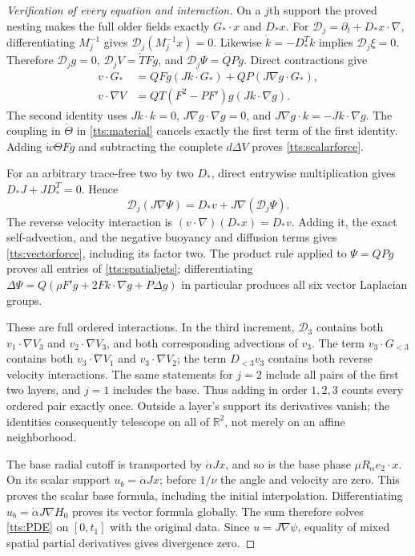 \begin{proof}[Verification of every equation and interaction]
On a $j$th support the proved nesting makes the full older fields
exactly $G_*\cdot x$ and $D_*x$. For
$\mathcal D_j=\partial_t+D_*x\cdot\nabla$, differentiating
$M_j^{-1}$ gives $\mathcal D_j(M_j^{-1}x)=0$.
Likewise $\dot k=-D_*^Tk$ implies $\mathcal D_j\xi=0$.
Therefore $\mathcal D_jg=0$, $\mathcal D_jV=\dot T Fg$,
and $\mathcal D_j\Psi=\dot QPg$. Direct contractions give
\[
 \begin{split}
 v\cdot G_*&=QFg(Jk\cdot G_*)+QP(J\nabla g\cdot G_*),\\
 v\cdot\nabla V&=QT(F^2-PF')g(Jk\cdot\nabla g).
 \end{split}
\]
The second identity uses $Jk\cdot k=0$,
$J\nabla g\cdot\nabla g=0$, and
$J\nabla g\cdot k=-Jk\cdot\nabla g$.
The coupling in $\dot\Theta$ in \eqref{tts:material}
cancels exactly the first term of the first identity. Adding
$\dot w\Theta Fg$ and subtracting the complete $d\Delta V$
proves \eqref{tts:scalarforce}.

For an arbitrary trace-free two by two $D_*$, direct entrywise
multiplication gives $D_*J+JD_*^T=0$. Hence
\[
 \mathcal D_j(J\nabla\Psi)=D_*v+J\nabla(\mathcal D_j\Psi).
\]
The reverse velocity interaction is
$(v\cdot\nabla)(D_*x)=D_*v$. Adding it, the exact
self-advection, and the negative buoyancy and diffusion terms
gives \eqref{tts:vectorforce}, including its factor two.
The product rule applied to $\Psi=QPg$ proves all entries of
\eqref{tts:spatialjets}; differentiating
$\Delta\Psi=Q(\rho F'g+2Fk\cdot\nabla g+P\Delta g)$
in particular produces all six vector Laplacian groups.

These are full ordered interactions. In the third increment,
$\mathcal D_3$ contains both $v_1\cdot\nabla V_3$ and
$v_2\cdot\nabla V_3$, and both corresponding advections of
$v_3$. The term $v_3\cdot G_{<3}$ contains both
$v_3\cdot\nabla V_1$ and $v_3\cdot\nabla V_2$; the
term $D_{<3}v_3$ contains both reverse velocity interactions.
The same statements for $j=2$ include all pairs of the first
two layers, and $j=1$ includes the base. Thus adding in order
$1,2,3$ counts every ordered pair exactly once. Outside a layer's
support its derivatives vanish; the identities consequently telescope
on all of $\mathbb R^2$, not merely on an affine neighborhood.

The base radial cutoff is transported by $\dot\alpha Jx$,
and so is the base phase $\mu R_\alpha e_2\cdot x$.
On its scalar support $u_b=\dot\alpha Jx$; before $1/\nu$
the angle and velocity are zero. This proves the scalar base
formula, including the initial interpolation. Differentiating
$u_b=\dot\alpha J\nabla H_0$ proves its vector formula
globally. The sum therefore solves \eqref{tts:PDE} on
$[0,t_1]$ with the original data. Since $u=J\nabla\psi$,
equality of mixed spatial partial derivatives gives divergence zero.
\end{proof}


